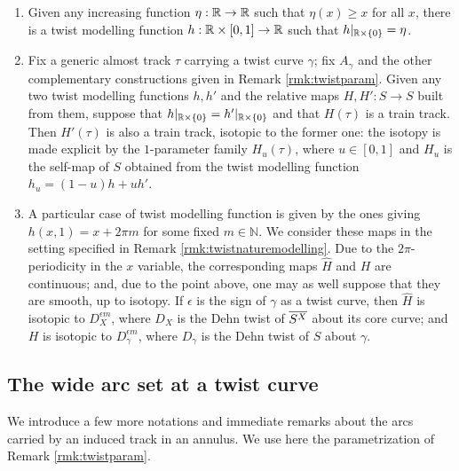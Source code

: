\begin{rmk}\label{rmk:twistfunctionsflexibility}
\begin{enumerate}
\item Given any increasing function $\eta:\mathbb R\rightarrow \mathbb R$ such that $\eta(x)\geq x$ for all $x$, there is a twist modelling function $h: \mathbb R\times[0,1]\rightarrow \mathbb R$ such that $h|_{\mathbb R\times\{0\}}=\eta$.

\item Fix a generic almost track $\tau$ carrying a twist curve $\gamma$; fix $A_\gamma$ and the other complementary constructions given in Remark \ref{rmk:twistparam}. Given any two twist modelling functions $h,h'$ and the relative maps $H,H':S\rightarrow S$ built from them, suppose that $h|_{\mathbb R\times\{0\}}=h'|_{\mathbb R\times\{0\}}$ and that $H(\tau)$ is a train track. Then $H'(\tau)$ is also a train track, isotopic to the former one: the isotopy is made explicit by the $1$-parameter family $H_u(\tau)$, where $u\in[0,1]$ and $H_u$ is the self-map of $S$ obtained from the twist modelling function $h_u=(1-u)h+uh'$.

\item A particular case of twist modelling function is given by the ones giving $h(x,1)=x+2\pi m$ for some fixed $m\in\mathbb N$. We consider these maps in the setting specified in Remark \ref{rmk:twistnaturemodelling}. Due to the $2\pi$-periodicity in the $x$ variable, the corresponding maps $\hat H$ and $H$ are continuous; and, due to the point above, one may as well suppose that they are smooth, up to isotopy. If $\epsilon$ is the sign of $\gamma$ as a twist curve, then $\hat H$ is isotopic to $D_X^{\epsilon m}$, where $D_X$ is the Dehn twist of $\overline{S^X}$ about its core curve; and $H$ is isotopic to $D_\gamma^{\epsilon m}$, where $D_\gamma$ is the Dehn twist of $S$ about $\gamma$.
\end{enumerate}
\end{rmk}

\subsection{The wide arc set at a twist curve}
We introduce a few more notations and immediate remarks about the arcs carried by an induced track in an annulus. We use here the parametrization of Remark \ref{rmk:twistparam}.

